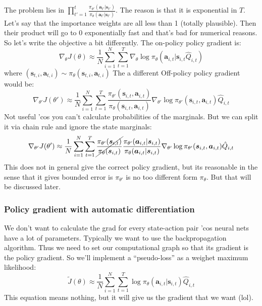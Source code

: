 \documentclass{report}
\begin{document}
The problem lies in $\prod_{t'=1}^{t} \frac{\pi_{\theta'} (\bm{a}_{t'} | \bm{s}_{t'})}{\pi_\theta(\bm{a}_{t'} | \bm{s}_{t'})}$.
The reason is that it is exponential in $T$.
Let's say that the importance weights are all less than 1 (totally plausible).
Then their product will go to 0 exponentially fast and that's bad for numerical reasons.
So let's write the objective a bit differently.
The on-policy policy gradient is:
\begin{equation}
		\nabla_\theta J(\theta) \approx
		\frac{1}{N} \sum_{i=1}^{N} \sum_{t=1}^{T} \nabla_\theta \log \pi_\theta(\bm{a}_{i,t}|\bm{s}_{i,t} \hat{Q}_{i,t} )
\end{equation}
where $(\bm{s}_{t,i}, \bm{a}_{t,i}) \sim \pi_\theta(\bm{s}_{t,i}, \bm{a}_{t,i})$
The a different Off-policy policy gradient would be:
\begin{equation}
		\nabla_{\theta'} J(\theta') \approx
		\frac{1}{N} \sum_{i=1}^{N} \sum_{t=1}^{T} 
		\frac{\pi_{\theta'}(\bm{s}_{i,t}, \bm{a}_{i,t})}{\pi_{\theta}(\bm{s}_{i,t}, \bm{a}_{i,t})} 
		\nabla_{\theta'} \log \pi_{\theta'} (\bm{s}_{i,t}, \bm{a}_{i,t}) 
		\hat{Q}_{i,t} 
\end{equation}
Not useful 'cos you can't calculate probabilities of the marginals.
But we can split it via chain rule and ignore the state marginals:
\begin{equation}
		\nabla_{\theta'} J(\theta') \approx
		\frac{1}{N} \sum_{i=1}^{N} \sum_{t=1}^{T}
		\cancel{\frac{\pi_{\theta'}(\bm{s}_{i,t})}{\pi_{\theta}(\bm{s}_{i,t})}  }
		\frac{\pi_{\theta'}( \bm{a}_{i,t} | \bm{s}_{i,t})}{\pi_{\theta}( \bm{a}_{i,t} | \bm{s}_{i,t})} 
		\nabla_{\theta'} \log \pi_{\theta'} (\bm{s}_{i,t}, \bm{a}_{i,t}) 
		\hat{Q}_{i,t} 
\end{equation}
This does not in general give the correct policy gradient, but its reasonable
in the sense that it gives bounded error is $\pi_{\theta'}$ is no too different form $\pi_\theta$.
But that will be discussed later.

\subsubsection{Policy gradient with automatic differentiation}
We don't want to calculate the grad for every state-action pair 'cos neural nets have a lot of 
parameters.
Typically we want to use the backpropagation algorithm.
Thus we need to set our computational graph so that its gradient is the policy gradient.
So we'll implement a ``pseudo-loss'' as a weighet maximum likelihood:
\begin{equation}
		\tilde{J}(\theta) \approx \frac{1}{N} \sum_{i=1}^{N} \sum_{t=1}^{T} \log \pi_\theta(\bm{a}_{i,t} | \bm{s}_{i,t}) \hat{Q}_{i,t}
\end{equation}
This equation means nothing, but it will give us the gradient that we want (lol).
\end{document}
